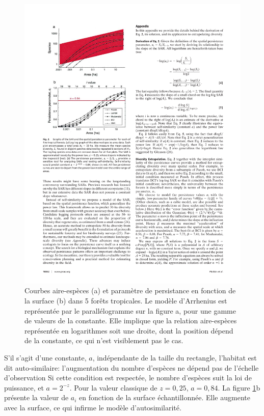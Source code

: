 \documentclass[
  11pt,
  french,
  a4paper,
  extrafontsizes,onecolumn,openright
  ]{memoir}
\newlength{\rf}
\begin{document}
\begin{figure}

{\centering \includegraphics[width=0.8\linewidth]{images/Plotkin2000} 

}

\caption{Courbes aire-espèces (a) et paramètre de persistance en fonction de la surface (b) dans 5 forêts tropicales. Le modèle d'Arrhenius est représentée par le parallélogramme sur la figure a, pour une gamme de valeurs de la constante. Elle implique que la relation aire-espèces représentée en logarithmes soit une droite, dont la position dépend de la constante, ce qui n'est visiblement pas le cas.}\label{fig:Plotkin2000}
\end{figure}

\normalsize

S'il s'agit d'une constante, \(a\), indépendante de la taille du rectangle, l'habitat est dit auto-similaire: l'augmentation du nombre d'espèces ne dépend pas de l'échelle d'observation Si cette condition est respectée, le nombre d'espèces suit la loi de puissance, et \(a=2^{-z}\).
Pour la valeur classique de \(z=0,25\), \(a=0,84\).
La figure \ref{fig:Plotkin2000}b \autocite{Plotkin2000} présente la valeur de \(a_i\) en fonction de la surface échantillonnée.
Elle augmente avec la surface, ce qui infirme le modèle d'autosimilarité.
\end{document}
